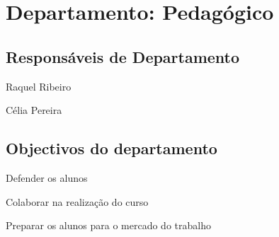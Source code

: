 \section{Departamento: Pedagógico}

\subsection{Responsáveis de Departamento}
\begin{itemizedash}
	\item Raquel Ribeiro
	\item Célia Pereira
\end{itemizedash}

\subsection{Objectivos do departamento}
\lipsum[2]
\begin{itemizedash}
	\item Defender os alunos
	\item Colaborar na realização do curso
	\item Preparar os alunos para o mercado do trabalho
\end{itemizedash}
